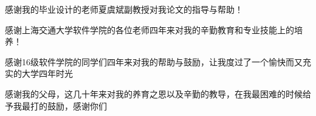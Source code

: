 

\begin{acknowledgements}
  感谢我的毕业设计的老师夏虞斌副教授对我论文的指导与帮助！

  感谢上海交通大学软件学院的各位老师四年来对我的辛勤教育和专业技能上的培养！

  感谢16级软件学院的同学们四年来对我的帮助与鼓励，让我度过了一个愉快而又充实的大学四年时光

  感谢我的父母，这几十年来对我的养育之恩以及辛勤的教导，在我最困难的时候给予我最打的鼓励，感谢你们
\end{acknowledgements}

